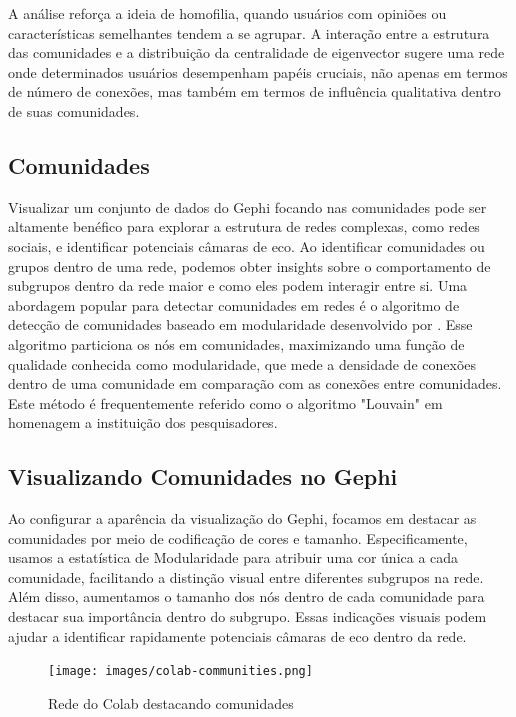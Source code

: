 A análise reforça a ideia de homofilia, quando usuários com opiniões ou características semelhantes tendem a se agrupar. A interação entre a estrutura das comunidades e a distribuição da centralidade de eigenvector sugere uma rede onde determinados usuários desempenham papéis cruciais, não apenas em termos de número de conexões, mas também em termos de influência qualitativa dentro de suas comunidades.

\subsection{Comunidades}

Visualizar um conjunto de dados do Gephi focando nas comunidades pode ser altamente benéfico para explorar a estrutura de redes complexas, como redes sociais, e identificar potenciais câmaras de eco. Ao identificar comunidades ou grupos dentro de uma rede, podemos obter insights sobre o comportamento de subgrupos dentro da rede maior e como eles podem interagir entre si. Uma abordagem popular para detectar comunidades em redes é o algoritmo de detecção de comunidades baseado em modularidade desenvolvido por . Esse algoritmo particiona os nós em comunidades, maximizando uma função de qualidade conhecida como modularidade, que mede a densidade de conexões dentro de uma comunidade em comparação com as conexões entre comunidades. Este método é frequentemente referido como o algoritmo "Louvain" em homenagem a instituição dos pesquisadores.

\subsection{Visualizando Comunidades no Gephi}

Ao configurar a aparência da visualização do Gephi, focamos em destacar as comunidades por meio de codificação de cores e tamanho. Especificamente, usamos a estatística de Modularidade para atribuir uma cor única a cada comunidade, facilitando a distinção visual entre diferentes subgrupos na rede. Além disso, aumentamos o tamanho dos nós dentro de cada comunidade para destacar sua importância dentro do subgrupo. Essas indicações visuais podem ajudar a identificar rapidamente potenciais câmaras de eco dentro da rede.

\begin{figure}[!hbtp]
	\caption{Rede do Colab destacando comunidades}
	\label{fig:colab_communities}
	\centering
	\texttt{[image: images/colab-communities.png]}
	\fautor
\end{figure}

